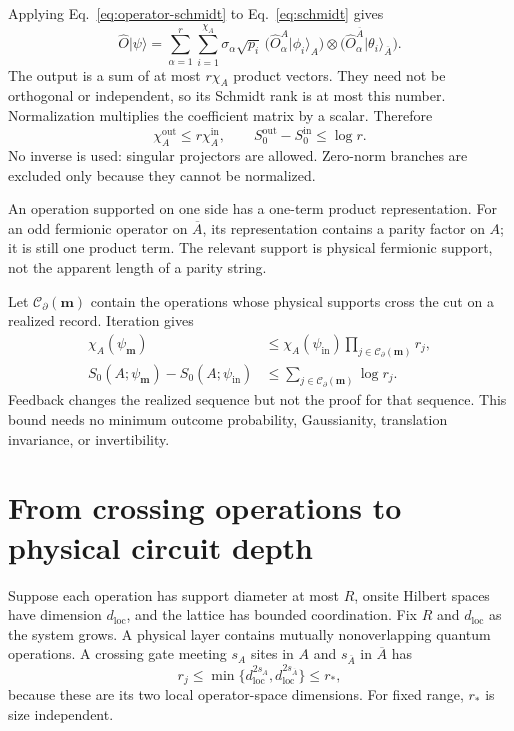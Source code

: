 \documentclass[aps,prb,onecolumn,nofootinbib,superscriptaddress]{revtex4-2}
\newcommand{\ket}[1]{\lvert #1\rangle}
\newcommand{\Abar}{\overline A}
\begin{document}
Applying Eq.~\eqref{eq:operator-schmidt} to Eq.~\eqref{eq:schmidt} gives
\begin{equation}
 \hat O\ket{\psi}
 =\sum_{\alpha=1}^{r}\sum_{i=1}^{\chi_A}
 \sigma_\alpha\sqrt{p_i}\,
 \bigl(\hat O^A_\alpha\ket{\phi_i}_A\bigr)\otimes
 \bigl(\hat O^{\Abar}_\alpha\ket{\theta_i}_{\Abar}\bigr).
 \label{eq:rank-product}
\end{equation}
The output is a sum of at most $r\chi_A$ product vectors. They need not
be orthogonal or independent, so its Schmidt rank is at most this number.
Normalization multiplies the coefficient matrix by a scalar. Therefore
\begin{equation}
 \chi_A^{\mathrm{out}}\leq r\chi_A^{\mathrm{in}},\qquad
 S_0^{\mathrm{out}}-S_0^{\mathrm{in}}\leq\log r .
 \label{eq:one-step}
\end{equation}
No inverse is used: singular projectors are allowed. Zero-norm branches
are excluded only because they cannot be normalized.

An operation supported on one side has a one-term product representation.
For an odd fermionic operator on $\Abar$, its representation contains a
parity factor on $A$; it is still one product term. The relevant support
is physical fermionic support, not the apparent length of a parity string.

Let $\mathcal C_\partial(\boldsymbol m)$ contain the operations whose
physical supports cross the cut on a realized record. Iteration gives
\begin{align}
 \chi_A(\psi_{\boldsymbol m})
 &\leq\chi_A(\psi_{\mathrm{in}})
 \prod_{j\in\mathcal C_\partial(\boldsymbol m)}r_j,\\
 S_0(A;\psi_{\boldsymbol m})-S_0(A;\psi_{\mathrm{in}})
 &\leq\sum_{j\in\mathcal C_\partial(\boldsymbol m)}\log r_j .
 \label{eq:exact-bound}
\end{align}
Feedback changes the realized sequence but not the proof for that sequence.
This bound needs no minimum outcome probability, Gaussianity, translation
invariance, or invertibility.

\section{From crossing operations to physical circuit depth}
\label{sec:depth}
Suppose each operation has support diameter at most $R$, onsite Hilbert
spaces have dimension $d_{\mathrm{loc}}$, and the lattice has bounded
coordination. Fix $R$ and $d_{\mathrm{loc}}$ as the system grows. A
physical layer contains mutually nonoverlapping quantum operations.
A crossing gate meeting $s_A$ sites in $A$ and $s_{\Abar}$ in $\Abar$ has
\begin{equation}
 r_j\leq\min\{d_{\mathrm{loc}}^{2s_A},
                   d_{\mathrm{loc}}^{2s_{\Abar}}\}\leq r_*,
 \label{eq:local-rank}
\end{equation}
because these are its two local operator-space dimensions. For fixed
range, $r_*$ is size independent.
\end{document}
